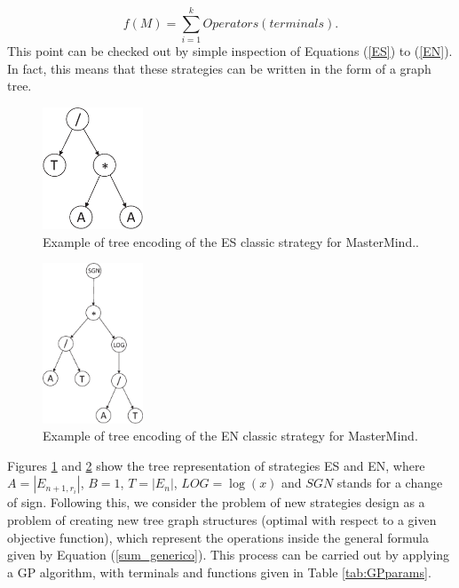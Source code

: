 \begin{equation}\label{sum_generico}
f(M)=\sum_{i=1}^k Operators(terminals).
\end{equation}
This point can be checked out by simple inspection of Equations (\ref{ES}) to (\ref{EN}). In fact, this means that these strategies can be written in the form of a graph tree.

\begin{figure}[!ht]
\begin{center}
\includegraphics[draft=false,angle=0,width=3cm]{./ES_tree.eps}
\end{center}
\caption{\label{Estrategia_ES} Example of tree encoding of the ES classic strategy for MasterMind..}
\end{figure}

\begin{figure}[!ht]
\begin{center}
\includegraphics[draft=false,angle=0,width=3cm]{./EN_tree.eps}
\end{center}
\caption{\label{Estrategia_EN} Example of tree encoding of the EN classic strategy for MasterMind.}
\end{figure}

Figures \ref{Estrategia_ES} and \ref{Estrategia_EN} show the tree representation of strategies ES and EN, where $A=|E_{n+1,r_i}|$, $B=1$, $T=|E_n|$, $LOG=\log(x)$ and $SGN$ stands for a change of sign. Following this, we consider the problem of new strategies design as a problem of creating new tree graph structures (optimal with respect to a given objective function), which represent the operations inside the general formula given by Equation (\ref{sum_generico}). This process can be carried out by applying a GP algorithm, with terminals and functions given in Table \ref{tab:GPparams}.

